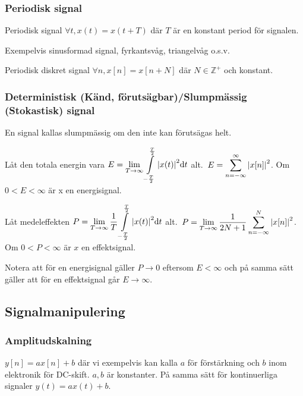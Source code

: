 \documentclass[a4paper]{article}
\begin{document}
\subsubsection{Periodisk signal}
Periodisk signal \(
    \forall t, x(t) = x(t+T)
\) där \(
    T
\) är en konstant period för signalen.

Exempelvis sinusformad signal, fyrkantsvåg, triangelvåg o.s.v.

Periodisk diskret signal \(
    \forall n, x[n] = x[n+N] 
\) där \(
    N \in \mathbb{Z}^+ 
\) och konstant.

\subsubsection{Deterministisk (Känd, förutsägbar)/Slumpmässig (Stokastisk) signal}
En signal kallas slumpmässig om den inte kan förutsägas helt.

\begin{defn}[Energisignal]
    Låt den totala energin vara \(
        E = \displaystyle\lim_{T \to \infty} \displaystyle\int\limits_{-\frac{T}{2}}^{\frac{T}{2}} \abs{x(t)}^2 \dd t
    \) alt.\ \(
        E = \displaystyle\sum_{n=-\infty}^{\infty} \abs{x[n]}^2
    \). Om \(
        0 < E < \infty
    \) är x en energisignal.
\end{defn}

\begin{defn}[Effektsignal]
    Låt medeleffekten \(
        P = \displaystyle\lim_{T \to \infty} \frac{1}{T} \displaystyle\int\limits_{-\frac{T}{2}}^{\frac{T}{2}} \abs{x(t)}^2 \dd t
    \) alt.\ \(
        P = \displaystyle\lim_{T \to \infty} \frac{1}{2N+1} \displaystyle\sum_{n=-\infty}^N \abs{x[n]}^2
    \). Om \(
        0 < P < \infty
    \) är \(
        x
    \) en effektsignal.
\end{defn}

Notera att för en energisignal gäller \(
    P \to 0
\) eftersom \(
    E < \infty
\) och på samma sätt gäller att för en effektsignal går \(
    E \to \infty 
\). 

\subsection{Signalmanipulering}
\subsubsection{Amplitudskalning}
\(
    y[n] = ax[n]+b
\) där vi exempelvis kan kalla \(
    a
\) för förstärkning och \(
    b
\) inom elektronik för DC-skift. \(
    a, b
\) är konstanter. På samma sätt för kontinuerliga signaler \(
    y(t) = ax(t) + b
\). 
\end{document}

